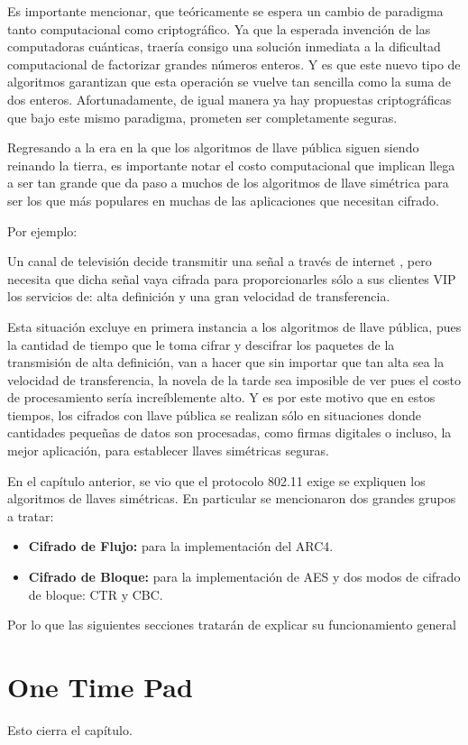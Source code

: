  Es importante mencionar, que teóricamente se espera un cambio de paradigma tanto computacional como criptográfico. Ya que la esperada invención de las computadoras cuánticas, traería consigo una solución inmediata a la dificultad computacional de factorizar grandes números enteros. Y es que este nuevo tipo de algoritmos garantizan que esta operación se vuelve tan sencilla como la suma de dos enteros. Afortunadamente, de igual manera ya hay propuestas criptográficas que bajo este mismo paradigma, prometen ser completamente seguras.
 
Regresando a la era en la que los algoritmos de llave pública siguen siendo reinando la tierra, es importante notar el costo computacional que implican llega a ser tan grande que da paso a muchos de los algoritmos de llave simétrica para ser los que más populares en muchas de las aplicaciones que necesitan cifrado. 

Por ejemplo: 

Un canal de televisión decide transmitir una señal a través de internet , pero necesita que dicha señal vaya cifrada para proporcionarles sólo a sus clientes VIP los servicios de: alta definición y una gran velocidad de transferencia.

Esta situación excluye en primera instancia a los algoritmos de llave pública, pues la cantidad de tiempo que le toma cifrar y descifrar los paquetes de la transmisión de alta definición, van a hacer que sin importar que tan alta sea la velocidad de transferencia, la novela de la tarde sea imposible de ver pues el costo de procesamiento sería increíblemente alto. Y es por este motivo que en estos tiempos, los cifrados con llave pública se realizan sólo en situaciones donde cantidades pequeñas de datos son procesadas, como firmas digitales o incluso, la mejor aplicación, para establecer llaves simétricas  seguras.

En el capítulo anterior, se vio que el protocolo 802.11 exige se expliquen los algoritmos de llaves simétricas. En particular se mencionaron dos grandes grupos a tratar:
\begin{itemize}
	\item {\bf Cifrado de Flujo:} para la implementación del ARC4.
	\item {\bf Cifrado de Bloque:} para la implementación de AES y dos modos de cifrado de bloque: CTR y CBC.
\end{itemize}
Por lo que las siguientes secciones tratarán de explicar su funcionamiento general


\section{One Time Pad}
Esto cierra el capítulo.



